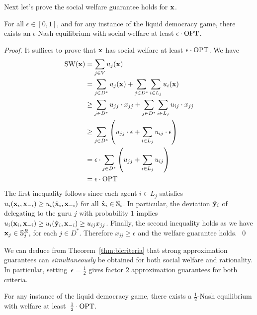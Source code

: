 Next let's prove the social welfare guarantee holds for ${\bf x}$.
\begin{thm}\label{thm:bicriteria}
For all $\epsilon\in [0,1]$, and for any instance of the liquid democracy game, there exists an $\epsilon$-Nash equilibrium with social 
welfare at least $\epsilon\cdot \operatorname{OPT}$.
\end{thm}
\begin{proof}
It suffices to prove that ${\bf x}$ has social welfare at least $\epsilon\cdot \operatorname{OPT}$.
We have	   
	\begin{align*}
	\operatorname{SW}({\bf x}) &= \sum_{j\in V} u_{j}({\bf x})  \\ 
	& = \sum_{j\in D^*} u_j({\bf x}) + \sum_{j\in D^*} \sum_{i\in L_j} u_i({\bf x}) \\ 
	&\geq \sum_{j\in D^*}u_{jj}\cdot  x_{jj} +  \sum_{j\in D^*} \sum_{i\in L_j} u_{ij}\cdot x_{jj} \\ 
	&\geq \sum_{j\in D^*} \left( u_{jj}\cdot \epsilon  +\sum_{i\in L_j} u_{ij}\cdot \epsilon \right)  \\ 
	&= \epsilon\cdot \sum_{j\in D^*} \left( u_{jj} +  \sum_{i\in L_j} u_{ij} \right)  \\ 
	&= \epsilon\cdot \operatorname{OPT}
	\end{align*}	
The first inequality follows since each agent $i\in L_j$ satisfies $u_i({\bf x}_i,{\bf x}_{-i})\geq u_i(\hat{{\bf x}}_i,{\bf x}_{-i})$ for all 
$\hat{{\bf x}}_i \in \mathbb{S}_i$. 
In particular, the deviation $\hat{{\bf y}}_i$ of delegating to the guru $j$ with probability $1$ 
implies $u_i({\bf x}_i,{\bf x}_{-i})\geq u_i(\hat{{\bf y}}_i,{\bf x}_{-i})\geq  u_{ij}x_{jj}$. Finally, the second inequality holds as
we have ${\bf x}_j\in  \mathbb{S}_j^R$, for each $j\in D^*$. Therefore $x_{jj}\geq \epsilon$ and the
welfare guarantee holds.~\qed
\end{proof}
We can deduce from Theorem~\ref{thm:bicriteria} that strong approximation guarantees can {\em simultaneously}
be obtained for both social welfare and rationality. In particular, setting~$\epsilon=\frac12$ gives factor $2$ approximation guarantees for both criteria.

\begin{cor} \label{cor:upper} 
For any instance of the liquid democracy game, there exists a $\frac12$-Nash equilibrium with welfare at least~$\frac12\cdot \operatorname{OPT}$.
\end{cor}

